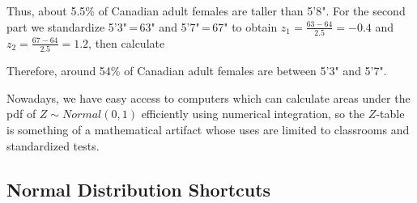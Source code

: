 \begin{examp}
\par
\noindent Thus, about 5.5\% of Canadian adult females are taller than 5'8". For the second part we standardize 5'3"\,=\,63" and 5'7"\,=\,67" to obtain $z_1 = \frac{63-64}{2.5} = -0.4$ and $z_2 = \frac{67-64}{2.5} = 1.2$, then calculate
\vspace{-1em}
\begin{center}
    \begin{minipage}{0.5\textwidth}
        \centering
  \vspace{1.25em}
    \end{minipage}\begin{minipage}{0.5\textwidth}
        \qquad\qquad\centering
\end{minipage}
\end{center}

\par
\noindent Therefore, around 54\% of Canadian adult females are between 5'3" and 5'7".
\end{examp}
\par
Nowadays, we have easy access to computers which can calculate areas under the pdf of $Z \sim Normal(0,1)$ efficiently using numerical integration, so the $Z$-table is something of a mathematical artifact whose uses are limited to classrooms and standardized tests.

\subsection*{Normal Distribution Shortcuts}

